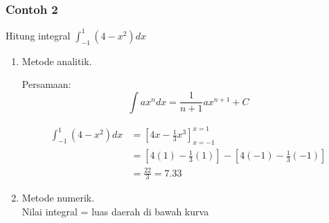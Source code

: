 \documentclass[pdflatex,compress]{beamer}
\begin{document}
\begin{frame}
	\frametitle{Contoh 2}

	Hitung integral $ \int_{-1}^{1} (4 - x^2) dx $
	
	\begin{enumerate}
		\item Metode analitik.
		
		Persamaan: 
		\begin{equation*}
			\int ax^n dx = \frac{1}{n+1}ax^{n+1} + C
		\end{equation*}
	
		\begin{align*}
			\int_{-1}^{1} (4 - x^2) dx &= \left[4x - \frac{1}{3}x^3\right]^{x=1}_{x=-1} \\
									   &=\left[ 4(1) - \frac{1}{3}(1) \right] - \left[ 4(-1) - \frac{1}{3}(-1) \right] \\
									   &= \frac{22}{3} = 7.33
		\end{align*}
	\end{enumerate}
	
\end{frame}

\begin{frame}
	\begin{enumerate}
		\setcounter{enumi}{1}
		\item Metode numerik. \\
		
		Nilai integral = luas daerah di bawah kurva
		
	\end{enumerate}
	
\end{frame}
\end{document}
